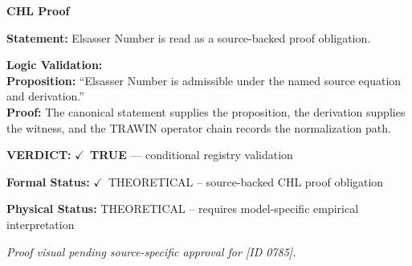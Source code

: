 \vspace{0.45em}
\noindent\textbf{CHL Proof}\par
\textbf{Statement:} Elsasser Number is read as a source-backed proof obligation.

\textbf{Logic Validation:}\\
\textbf{Proposition:} ``Elsasser Number is admissible under the named source equation and derivation.''\\
\textbf{Proof:} The canonical statement supplies the proposition, the derivation supplies the witness, and the TRAWIN operator chain records the normalization path.

\textbf{VERDICT:} \ensuremath{\checkmark}\ \textbf{TRUE} --- conditional registry validation

\textbf{Formal Status:} \ensuremath{\checkmark}\ THEORETICAL -- source-backed CHL proof obligation

\textbf{Physical Status:} THEORETICAL -- requires model-specific empirical interpretation
\par\vspace{0.45em}
\par
\vfill
\begingroup\footnotesize\itshape
Proof visual pending source-specific approval for [ID 0785].
\par\endgroup
\vfill
\endgroup
\endgroup
